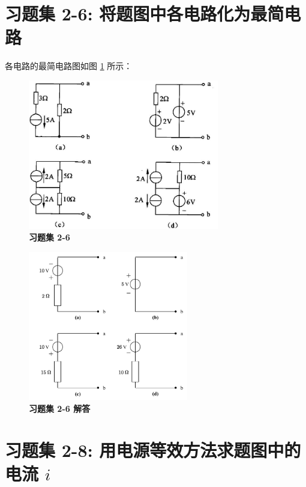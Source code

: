 \documentclass[UTF8]{report}
\theoremstyle{MyLineTheoremStyle} %
\theoremstyle{MyBlockTheoremStyle} %
\theoremstyle{MySubsubsectionStyle} %
\begin{document}
\section{习题集 2-6: 将题图中各电路化为最简电路}

各电路的最简电路图如图 \ref{习题集 2-6 解答} 所示： 

\noindent\begin{minipage}{0.50\textwidth}
    \begin{figure}[H]\centering
        \includegraphics[height=185pt]{assets/2/bfc7d58924b9eaf9582656c984bd2c3b.jpg}
        \caption{\textbf{习题集 2-6}}
    \end{figure}
\end{minipage}\hfill
\begin{minipage}{0.50\textwidth}
    \begin{figure}[H]\centering
        \includegraphics[height=185pt]{assets/2/2-6.drawio.pdf}
        \caption{\textbf{习题集 2-6 解答}}\label{习题集 2-6 解答}
    \end{figure}        
\end{minipage}


\section{习题集 2-8: 用电源等效方法求题图中的电流 $i$}
\end{document}
